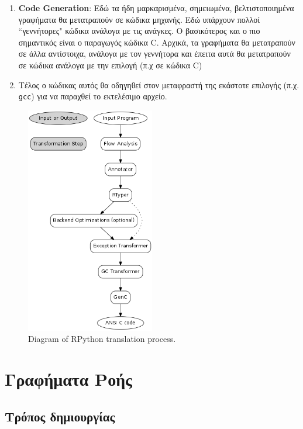 \begin{enumerate}
\begin{itemize}
\end{itemize}

\item \textbf{Code Generation}: Εδώ τα ήδη μαρκαρισμένα, σημειωμένα,
βελτιστοποιημένα γραφήματα θα μετατραπούν σε κώδικα μηχανής. Εδώ υπάρχουν 
πολλοί ``γεννήτορες" κώδικα ανάλογα με τις ανάγκες. Ο βασικότερος και ο πιο 
σημαντικός είναι ο παραγωγός κώδικα C. Αρχικά, τα γραφήματα θα μετατραπούν σε 
άλλα αντίστοιχα, ανάλογα με τον γεννήτορα και έπειτα αυτά θα μετατραπούν σε
κώδικα ανάλογα με την επιλογή (π.χ σε κώδικα C)

\item Τέλος ο κώδικας αυτός θα οδηγηθεί στον μεταφραστή της εκάστοτε επιλογής
(π.χ. \texttt{gcc}) για να παραχθεί το εκτελέσιμο αρχείο.

\end{enumerate}

\begin{figure}[h]
\centering
\includegraphics[width=0.5\textwidth]{diagram.png}
\caption{Diagram of RPython translation process. \cite{rigo2005}}
\label{figure-1}
\end{figure}

\section{Γραφήματα Ροής}

\subsection{Τρόπος δημιουργίας}

